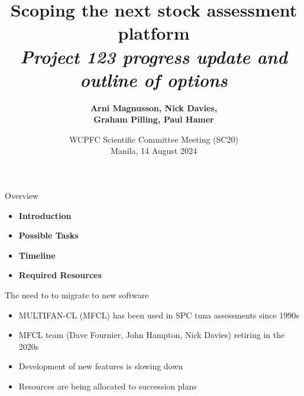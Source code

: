 \documentclass[aspectratio=169,fleqn]{beamer}
\begin{document}
\begin{frame}
  \title{\vspace{-5ex}\darkblue Scoping the next stock assessment
    platform\\[2ex]
    \it\large\darkgray
    Project 123 progress update and outline of options}
  \author{\vspace{-10ex}\darkgray\bf
    Arni Magnusson, Nick Davies,\\[0.5ex]
    Graham Pilling, Paul Hamer}
  \date{\darkgreen WCPFC Scientific Committee Meeting (SC20)\\[0.5ex]
    Manila, 14 August 2024}
  \titlepage
\end{frame}


\begin{frame}{Overview}
  \begin{itemize}
    \item[] {\bf\darkblue Introduction} \\[5ex]
    \item[] {\bf\darkblue Possible Tasks} \\[5ex]
    \item[] {\bf\darkblue Timeline} \\[5ex]
    \item[] {\bf\darkblue Required Resources} \\[1ex]
  \end{itemize}
\end{frame}


\begin{frame}{The need to to migrate to new software}
  \begin{itemize}
    \item[] MULTIFAN-CL (MFCL) has been used in SPC tuna assessments since
    1990s\\[4ex]
    \item[] MFCL team (Dave Fournier, John Hampton, Nick Davies) retiring in the
    2020s\\[4ex]
    \item[] Development of new features is slowing down\\[4ex]
    \item[] Resources are being allocated to succession plans\\[2ex]
  \end{itemize}
\end{frame}
\end{document}
